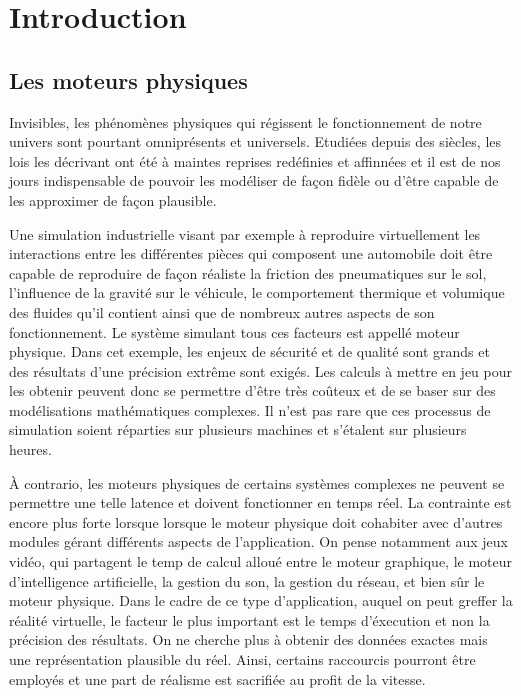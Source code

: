 \section{Introduction}

\subsection{Les moteurs physiques}

Invisibles, les phénomènes physiques qui régissent le fonctionnement de notre univers sont pourtant omniprésents et universels. Etudiées depuis des siècles, les lois les décrivant ont été à maintes reprises redéfinies et affinnées et il est de nos jours indispensable de pouvoir les modéliser de façon fidèle ou d'être capable de les approximer de façon plausible. 

Une simulation industrielle visant par exemple à reproduire virtuellement les interactions entre les différentes pièces qui composent une automobile doit être capable de reproduire de façon réaliste la friction des pneumatiques sur le sol, l'influence de la gravité sur le véhicule, le comportement thermique et volumique des fluides qu'il contient ainsi que de nombreux autres aspects de son fonctionnement. Le système simulant tous ces facteurs est appellé moteur physique. Dans cet exemple, les enjeux de sécurité et de qualité sont grands et des résultats d'une précision extrême sont exigés. Les calculs à mettre en jeu pour les obtenir peuvent donc se permettre d'être très coûteux et de se baser sur des modélisations mathématiques complexes. Il n'est pas rare que ces processus de simulation soient réparties sur plusieurs machines et s'étalent sur plusieurs heures.

\`A contrario, les moteurs physiques de certains systèmes complexes ne peuvent se permettre une telle latence et doivent fonctionner en temps réel. La contrainte est encore plus forte lorsque lorsque le moteur physique doit cohabiter avec d'autres modules gérant différents aspects de l'application. On pense notamment aux jeux vidéo, qui partagent le temp de calcul alloué entre le moteur graphique, le moteur d'intelligence artificielle, la gestion du son, la gestion du réseau, et bien sûr le moteur physique. Dans le cadre de ce type d'application, auquel on peut greffer la réalité virtuelle, le facteur le plus important est le temps d'éxecution et non la précision des résultats. On ne cherche plus à obtenir des données exactes mais une représentation plausible du réel. Ainsi, certains raccourcis pourront être employés et une part de réalisme est sacrifiée au profit de la vitesse.

